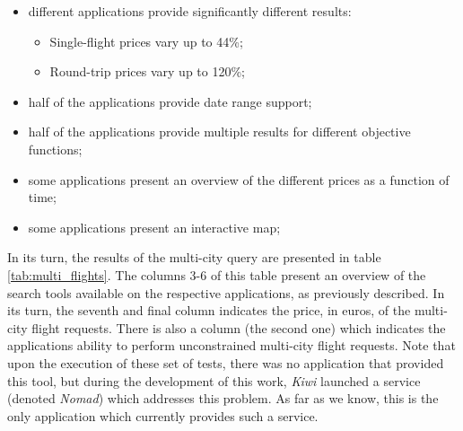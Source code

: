 \begin{itemize}[itemsep=0pt, partopsep=0pt]
  \item different applications provide significantly different results: 
    \begin{itemize}[itemsep=0pt, topsep=0pt]
        \item Single-flight prices vary up to 44\%;
        \item Round-trip prices vary up to 120\%;
    \end{itemize}
  \item half of the applications provide date range support;
  \item half of the applications provide multiple results for different objective functions;
  \item some applications present an overview of the different prices as a function of time;
  \item some applications present an interactive map;
\end{itemize}



In its turn, the results of the multi-city query are presented in table  \ref{tab:multi_flights}. The columns 3-6 of this table present an overview of the search tools available on the respective applications, as previously described. In its turn, the seventh and final column indicates the price, in euros, of the multi-city flight requests. There is also a column (the second one) which indicates the applications ability to perform unconstrained multi-city flight requests. Note that upon the execution of these set of tests, there was no application that provided this tool, but during the development of this work, \textit{Kiwi} launched a service (denoted \textit{Nomad}) which addresses this problem. As far as we know, this is the only application which currently provides such a service.

